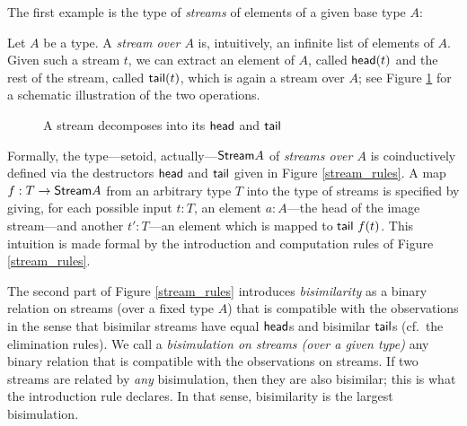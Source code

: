 \documentclass[a4paper,USenglish]{lipics}
\begin{document}
\noindent
The first example is the type of \emph{streams} of elements of a given base type $A$:


\begin{example}
 \label{ex_stream}
  Let $A$ be a type. A \emph{stream over $A$} is, intuitively, an infinite list of elements of $A$. 
  Given such a stream $t$, we can extract an element of $A$, called $\mathsf{head}(t)$ and the rest of the stream, called $\mathsf{tail}(t)$, which is again a stream over $A$; see Figure \ref{fig:stream} for a schematic illustration of the two operations.
  \begin{figure}[htb]
    \centering
   \caption{A stream decomposes into its $\mathsf{head}$ and $\mathsf{tail}$} \label{fig:stream}
  \end{figure}
  Formally, the type---setoid, actually---$\mathsf{Stream} A$ of \emph{streams over $A$} is coinductively defined via the destructors $\mathsf{head}$ and $\mathsf{tail}$
  given in Figure \ref{stream_rules}.  A map $f:T\to \mathsf{Stream} A$ from an arbitrary type $T$ into the type of streams is specified by giving, for each possible input $t:T$, 
  an element $a:A$---the head of the image stream---and another $t':T$---an element which is mapped to $\mathsf{tail}~f(t)$. This intuition is made formal by the 
  introduction and computation rules of Figure \ref{stream_rules}.
  
  The second part of Figure \ref{stream_rules} introduces \emph{bisimilarity} as a binary relation on streams (over a fixed type $A$) that is compatible with the observations
  in the sense that bisimilar streams have equal $\mathsf{head}$s and bisimilar $\mathsf{tail}$s (cf.\ the elimination rules). 
  We call a \emph{bisimulation on streams (over a given type)} any binary relation that is compatible with the observations on streams.
  If two streams are related by \emph{any} bisimulation,
  then they are also bisimilar; this is what the introduction rule declares. In that sense, bisimilarity is the largest bisimulation.


\end{example}
\end{document}
